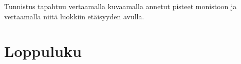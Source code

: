 Tunnistus tapahtuu vertaamalla kuvaamalla annetut pisteet monistoon ja vertaamalla niitä luokkiin etäisyyden avulla.\\





















\section{Loppuluku}




